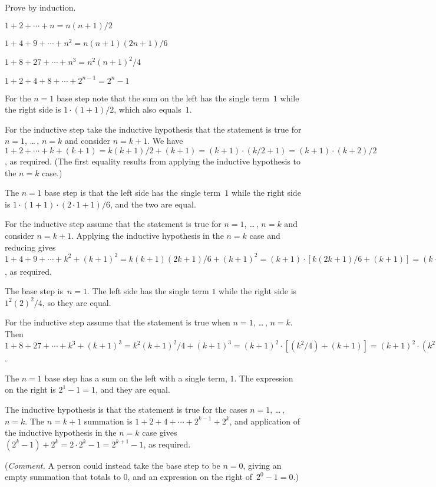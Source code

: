 \documentclass{ibl}
\begin{document}
\begin{ex}
Prove by induction.
\begin{exes}
\item $1+2+\cdots+n=n(n+1)/2$
\item $1+4+9+\cdots+n^2=n(n+1)(2n+1)/6$
\item $1+8+27+\cdots+n^3=n^2(n+1)^2/4$
\item $1+2+4+8+\cdots+2^{n-1}=2^n-1$
\end{exes}
\begin{ans}
\begin{exes}
\item For the $n=1$ base step note that the sum on the left
  has the single term~$1$
  while the right side is $1\cdot(1+1)/2$, which also equals~$1$.

  For the inductive step take the inductive hypothesis 
  that the statement is true for $n=1$, 
  \ldots\,, $n=k$ and consider $n=k+1$.
  We have 
  $1+2+\cdots+k+(k+1)=k(k+1)/2+(k+1)=(k+1)\cdot(k/2+1)=(k+1)\cdot(k+2)/2$, 
  as required.  
  (The first equality results from applying the inductive hypothesis to 
  the $n=k$ case.) 
\item The $n=1$ base step is that the left side has the single term~$1$
  while the right side is $1\cdot(1+1)\cdot(2\cdot 1+1)/6$, and the 
  two are equal.

  For the inductive step assume that the statement is true for 
  $n=1$, \ldots\,, $n=k$ and consider $n=k+1$.
  Applying the inductive hypothesis in the $n=k$ case and reducing gives
  $1+4+9+\cdots+k^2+(k+1)^2=k(k+1)(2k+1)/6+(k+1)^2
    =(k+1)\cdot [k(2k+1)/6+(k+1)]
    =(k+1)\cdot [k(2k+1)+6(k+1)]/6
    =(k+1)\cdot [2k^2+7k+6]/6
    =(k+1)(k+2)(2(k+1)+1)/6$,
  as required.
\item The base step is~$n=1$.  
  The left side has the single term $1$ while the right side is 
  $1^2(2)^2/4$, so they are equal.

  For the inductive step assume that the statement is true when $n=1$, 
  \ldots\,, $n=k$.
  Then 
   $1+8+27+\cdots+k^3+(k+1)^3
    =k^2(k+1)^2/4+(k+1)^3
    =(k+1)^2\cdot [(k^2/4)+(k+1)]
    =(k+1)^2\cdot (k^2+4k+4)/4
    =(k+1)^2(k+2)^2/4$. 
\item The $n=1$ base step has a sum on the left with a single term, $1$.
The expression on the right is $2^1-1=1$, and they are equal.

The inductive hypothesis is that 
the statement is true for the cases $n=1$, \ldots\,, $n=k$.
The $n=k+1$ summation is
$1+2+4+\cdots+2^{k-1}+2^k$, 
and application of the inductive hypothesis in the $n=k$ case gives
$(2^k-1)+2^k=2\cdot 2^k-1=2^{k+1}-1$, as required. 

(\textit{Comment.} A person could instead take the base step to be
$n=0$, giving an empty summation that totals to $0$, and an expression
on the right of~$2^0-1=0$.)   
\end{exes}
\end{ans}
\end{ex}
\end{document}
